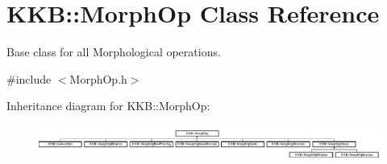 \hypertarget{class_k_k_b_1_1_morph_op}{}\section{K\+KB\+:\+:Morph\+Op Class Reference}
\label{class_k_k_b_1_1_morph_op}


Base class for all Morphological operations.  




{\ttfamily \#include $<$Morph\+Op.\+h$>$}

Inheritance diagram for K\+KB\+:\+:Morph\+Op\+:\begin{figure}[H]
\begin{center}
\leavevmode
\includegraphics[height=1.173184cm]{class_k_k_b_1_1_morph_op}
\end{center}
\end{figure}
